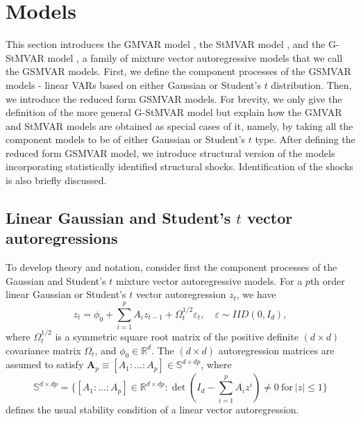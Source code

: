 \documentclass[nojss]{jss}
\begin{document}
\section{Models}\label{sec:models}
This section introduces the GMVAR model \citep{Kalliovirta+Meitz+Saikkonen:2016}, the StMVAR model \citep{Virolainen2:2021}, and the G-StMVAR model \citep{Virolainen2:2021}, a family of mixture vector autoregressive models that we call the GSMVAR models. First, we define the component processes of the GSMVAR models - linear VARs based on either Gaussian or Student's $t$ distribution. Then, we introduce the reduced form GSMVAR models. For brevity, we only give the definition of the more general G-StMVAR model but explain how the GMVAR and StMVAR models are obtained as special cases of it, namely, by taking all the component models to be of either Gaussian or Student's $t$ type. After defining the reduced form GSMVAR model, we introduce structural version of the models incorporating statistically identified structural shocks. Identification of the shocks is also briefly discussed.

\subsection{Linear Gaussian and Student's $t$ vector autoregressions}\label{sec:linvar}
To develop theory and notation, consider first the component processes of the Gaussian and Student's $t$ mixture vector autoregressive models. For a $p$th order linear Gaussian or Student's $t$ vector autoregression $z_t$, we have
\begin{equation}\label{eq:gaussianvar}
z_t = \phi_{0} + \sum_{i=1}^pA_iz_{t-1} + \Omega_t^{1/2}\varepsilon_t, \quad \varepsilon\sim IID(0,I_d),
\end{equation}
where $\Omega_t^{1/2}$ is a symmetric square root matrix of the positive definite $(d\times d)$ covariance matrix $\Omega_t$, and $\phi_0\in\mathbb{R}^d$. The $(d \times d)$ autoregression matrices are assumed to satisfy $\boldsymbol{A}_p \equiv [A_1:...:A_p]\in\mathbb{S}^{d\times dp}$, where
\begin{equation}\label{eq:statreg}
\mathbb{S}^{d\times dp}= \lbrace [A_1:...:A_p]\in\mathbb{R}^{d\times dp}: \det(I_d - \sum_{i=1}^pA_iz^i)\neq 0 \ \text{for} \ |z|\leq 1 \rbrace
\end{equation}
defines the usual stability condition of a linear vector autoregression.
\end{document}
